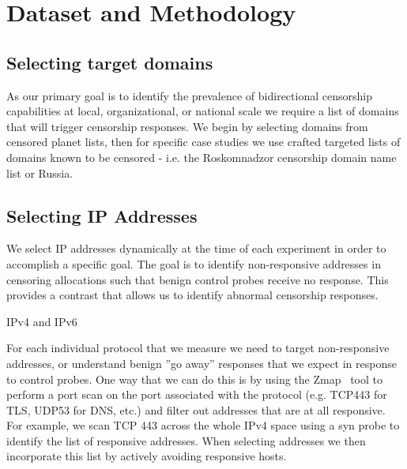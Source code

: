 \section{Dataset and Methodology}\label{sec:methodology}





\subsection{Selecting target domains}
\label{sec:methodology:domains}
As our primary goal is to identify the prevalence of bidirectional censorship
capabilities at local, organizational, or national scale we require a list of
domains that will trigger censorship responses. We begin by selecting domains
from censored planet lists, then for specific case studies we use crafted
targeted lists of domains known to be censored - i.e. the Roskomnadzor
censorship domain name list or Russia.

\subsection{Selecting IP Addresses}
\label{subsec:selecting-ips}
We select IP addresses dynamically at the time of each experiment in order to
accomplish  a specific goal. The goal is to identify non-responsive addresses in
censoring allocations such that benign control probes receive no response. This
provides a contrast that allows us to identify abnormal censorship responses.

IPv4 and IPv6

For each individual protocol that we measure we need to target non-responsive
addresses, or understand benign ''go away'' responses that we expect in response
to control probes. One way that we can do this is by using the
Zmap~\cite{Durumeric13zmap} tool to perform a port scan on the port associated
with the protocol (e.g. TCP443 for TLS, UDP53 for DNS, etc.) and filter out
addresses that are at all responsive. For example, we scan TCP 443 across the
whole IPv4 space using a syn probe to identify the list of responsive addresses.
When selecting addresses we then incorporate this list by actively avoiding
responsive hosts.


